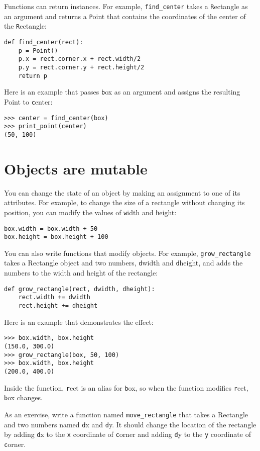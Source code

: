 \documentclass[
DIV=11,
fontsize=12,
twoside,
headinclude=false,
titlepage=firstiscover,
abstract=true,
headsepline=true,
footsepline=true,
chapterprefix=true, %
headings=big,
bibliography=totoc,%
captions=tableheading
]{scrbook}
\theoremstyle{definition}
\begin{document}
Functions can return instances.  For example, \verb"find_center"
takes a {\texttt Rectangle} as an argument and returns a {\texttt Point}
that contains the coordinates of the center of the {\texttt Rectangle}:

\begin{lstlisting}
def find_center(rect):
    p = Point()
    p.x = rect.corner.x + rect.width/2
    p.y = rect.corner.y + rect.height/2
    return p
\end{lstlisting}
%
Here is an example that passes {\texttt box} as an argument and assigns
the resulting Point to {\texttt center}:

\begin{lstlisting}
>>> center = find_center(box)
>>> print_point(center)
(50, 100)
\end{lstlisting}
%

\section{Objects are mutable}

You can change the state of an object by making an assignment to one of
its attributes.  For example, to change the size of a rectangle
without changing its position, you can modify the values of {\texttt
width} and {\texttt height}:

\begin{lstlisting}
box.width = box.width + 50
box.height = box.height + 100
\end{lstlisting}
%
You can also write functions that modify objects.  For example,
\verb"grow_rectangle" takes a Rectangle object and two numbers,
{\texttt dwidth} and {\texttt dheight}, and adds the numbers to the
width and height of the rectangle:

\begin{lstlisting}
def grow_rectangle(rect, dwidth, dheight):
    rect.width += dwidth
    rect.height += dheight
\end{lstlisting}
%
Here is an example that demonstrates the effect:

\begin{lstlisting}
>>> box.width, box.height
(150.0, 300.0)
>>> grow_rectangle(box, 50, 100)
>>> box.width, box.height
(200.0, 400.0)
\end{lstlisting}
%
Inside the function, {\texttt rect} is an
alias for {\texttt box}, so when the function modifies {\texttt rect}, 
{\texttt box} changes.

As an exercise, write a function named \verb"move_rectangle" that takes
a Rectangle and two numbers named {\texttt dx} and {\texttt dy}.  It
should change the location of the rectangle by adding {\texttt dx}
to the {\texttt x} coordinate of {\texttt corner} and adding {\texttt dy}
to the {\texttt y} coordinate of {\texttt corner}.
\end{document}
